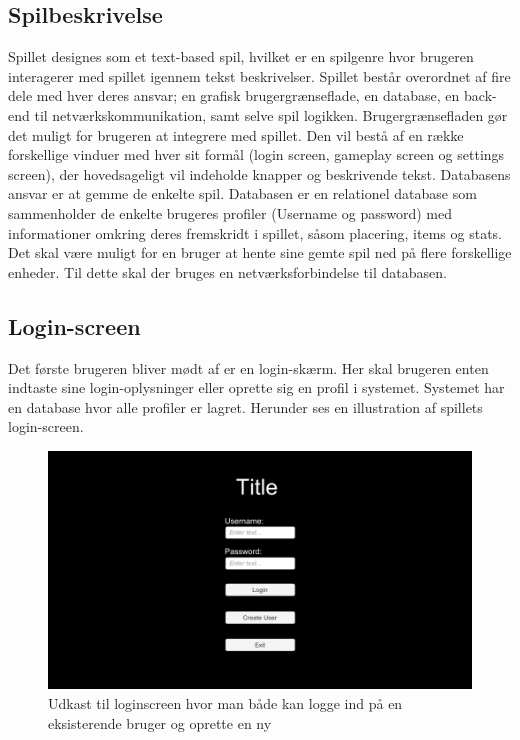 \newpage

\subsection{Spilbeskrivelse}

Spillet designes som et text-based spil, hvilket er en spilgenre hvor brugeren interagerer med spillet igennem tekst beskrivelser. Spillet består overordnet af fire dele med hver deres ansvar; en grafisk brugergrænseflade, en database, en back-end til netværkskommunikation, samt selve spil logikken. Brugergrænsefladen gør det muligt for brugeren at integrere med spillet. Den vil bestå af en række forskellige vinduer med hver sit formål (login screen, gameplay screen og settings screen), der hovedsageligt vil indeholde knapper og beskrivende tekst. Databasens ansvar er at gemme de enkelte spil. Databasen er en relationel database som sammenholder de enkelte brugeres profiler (Username og password) med informationer omkring deres fremskridt i spillet, såsom placering, items og stats. Det skal være muligt for en bruger at hente sine gemte spil ned på flere forskellige enheder. Til dette skal der bruges en netværksforbindelse til databasen.   

\subsection{Login-screen}
Det første brugeren bliver mødt af er en login-skærm. Her skal brugeren enten indtaste sine login-oplysninger eller oprette sig en profil i systemet. Systemet har en database hvor alle profiler er lagret. Herunder ses en illustration af spillets login-screen. 

\begin{figure}[H]
\centering
\includegraphics[width = \textwidth]{02-Body/Images/Loginscreen-udkast.png}
\caption{Udkast til loginscreen hvor man både kan logge ind på en eksisterende bruger og oprette en ny}
\label{fig:Loginscreen-udkast}
\end{figure}

